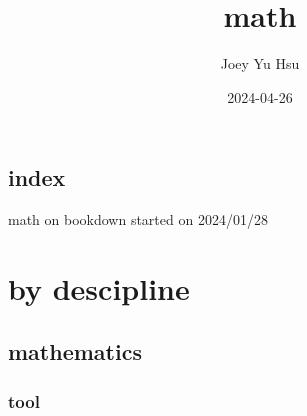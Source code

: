 \documentclass[
]{book}
\title{math}
\author{Joey Yu Hsu}
\date{2024-04-26}
\theoremstyle{definition}
\theoremstyle{definition}
\theoremstyle{definition}
\theoremstyle{definition}
\theoremstyle{remark}
\begin{document}
\maketitle

{
\hypersetup{linkcolor=}
\setcounter{tocdepth}{4}
\tableofcontents
}
\chapter*{index}\label{index}

math on bookdown started on 2024/01/28

\part{by descipline}\label{part-by-descipline}

\chapter{mathematics}\label{mathematics}

\section{tool}\label{tool}
\end{document}
